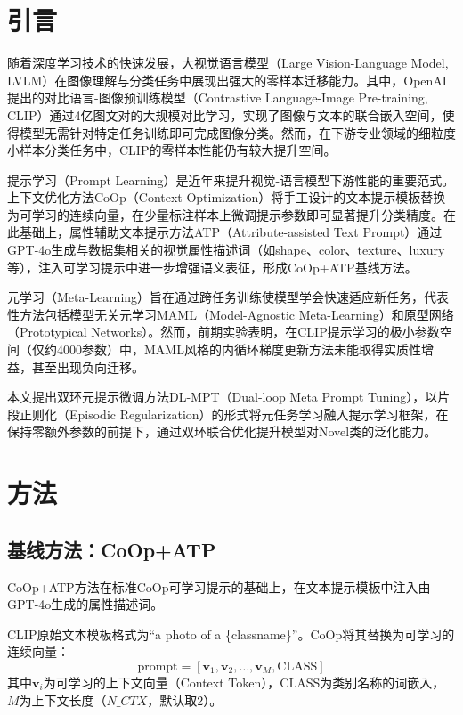 \documentclass[10pt,a4paper]{ctexart}
\begin{document}
\section{引言}

随着深度学习技术的快速发展，大视觉语言模型（Large Vision-Language Model, LVLM）在图像理解与分类任务中展现出强大的零样本迁移能力。其中，OpenAI提出的对比语言-图像预训练模型（Contrastive Language-Image Pre-training, CLIP）通过4亿图文对的大规模对比学习，实现了图像与文本的联合嵌入空间，使得模型无需针对特定任务训练即可完成图像分类。然而，在下游专业领域的细粒度小样本分类任务中，CLIP的零样本性能仍有较大提升空间。

提示学习（Prompt Learning）是近年来提升视觉-语言模型下游性能的重要范式。上下文优化方法CoOp（Context Optimization）将手工设计的文本提示模板替换为可学习的连续向量，在少量标注样本上微调提示参数即可显著提升分类精度。在此基础上，属性辅助文本提示方法ATP（Attribute-assisted Text Prompt）通过GPT-4o生成与数据集相关的视觉属性描述词（如shape、color、texture、luxury等），注入可学习提示中进一步增强语义表征，形成CoOp+ATP基线方法。

元学习（Meta-Learning）旨在通过跨任务训练使模型学会快速适应新任务，代表性方法包括模型无关元学习MAML（Model-Agnostic Meta-Learning）和原型网络（Prototypical Networks）。然而，前期实验表明，在CLIP提示学习的极小参数空间（仅约4000参数）中，MAML风格的内循环梯度更新方法未能取得实质性增益，甚至出现负向迁移。

本文提出双环元提示微调方法DL-MPT（Dual-loop Meta Prompt Tuning），以片段正则化（Episodic Regularization）的形式将元任务学习融入提示学习框架，在保持零额外参数的前提下，通过双环联合优化提升模型对Novel类的泛化能力。

\section{方法}

\subsection{基线方法：CoOp+ATP}

CoOp+ATP方法在标准CoOp可学习提示的基础上，在文本提示模板中注入由GPT-4o生成的属性描述词。

CLIP原始文本模板格式为``a photo of a \{classname\}''。CoOp将其替换为可学习的连续向量：
\begin{equation}
    \text{prompt} = [\mathbf{v}_1, \mathbf{v}_2, \ldots, \mathbf{v}_{M}, \text{CLASS}]
\end{equation}
其中$\mathbf{v}_i$为可学习的上下文向量（Context Token），CLASS为类别名称的词嵌入，$M$为上下文长度（$N\_CTX$，默认取2）。
\end{document}
